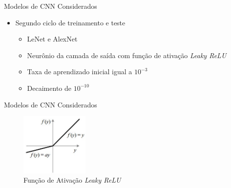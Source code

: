 \begin{frame}{Modelos de CNN Considerados}
     \begin{itemize}
          \item Segundo ciclo de treinamento e teste
          \begin{itemize}
               \item LeNet e AlexNet
               \item Neurônio da camada de saída com função de ativação \emph{Leaky ReLU}
               \item Taxa de aprendizado inicial igual a $10^{-3}$
               \item Decaimento de $10^{-10}$
          \end{itemize}
     \end{itemize}
\end{frame}

\begin{frame}{Modelos de CNN Considerados}
               \begin{figure}[h!]
                    \centering
                    \includegraphics[width=0.3\textwidth]{img/lrelu}
                    \caption{Função de Ativação \emph{Leaky ReLU}}
                    \label{fig:lrelu}
               \end{figure}
\end{frame}
